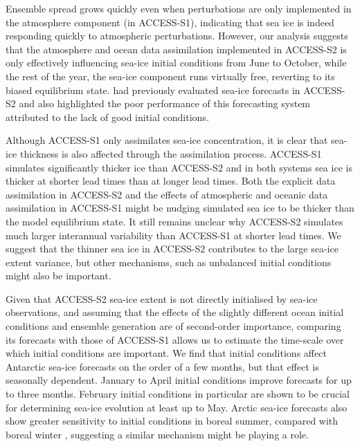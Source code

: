 \documentclass[tc, manuscript]{copernicus}
\begin{document}
Ensemble spread grows quickly even when perturbations are only
implemented in the atmosphere component (in ACCESS-S1), indicating that
sea ice is indeed responding quickly to atmospheric perturbations.
However, our analysis suggests that the atmosphere and ocean data
assimilation implemented in ACCESS-S2 is only effectively influencing
sea-ice initial conditions from June to October, while the rest of the
year, the sea-ice component runs virtually free, reverting to its biased
equilibrium state. \citet{zhou2022} had previously evaluated sea-ice
forecasts in ACCESS-S2 and also highlighted the poor performance of this
forecasting system attributed to the lack of good initial conditions.

Although ACCESS-S1 only assimilates sea-ice concentration, it is clear
that sea-ice thickness is also affected through the assimilation
process. ACCESS-S1 simulates significantly thicker ice than ACCESS-S2
and in both systems sea ice is thicker at shorter lead times than at
longer lead times. Both the explicit data assimilation in ACCESS-S2 and
the effects of atmospheric and oceanic data assimilation in ACCESS-S1
might be nudging simulated sea ice to be thicker than the model
equilibrium state. It still remains unclear why ACCESS-S2 simulates much
larger interannual variability than ACCESS-S1 at shorter lead times. We
suggest that the thinner sea ice in ACCESS-S2 contributes to the large
sea-ice extent variance, but other mechanisms, such as unbalanced
initial conditions might also be important.

Given that ACCESS-S2 sea-ice extent is not directly initialised by
sea-ice observations, and assuming that the effects of the slightly
different ocean initial conditions and ensemble generation are of
second-order importance, comparing its forecasts with those of ACCESS-S1
allows us to estimate the time-scale over which initial conditions are
important. We find that initial conditions affect Antarctic sea-ice
forecasts on the order of a few months, but that effect is seasonally
dependent. January to April initial conditions improve forecasts for up
to three months. February initial conditions in particular are shown to
be crucial for determining sea-ice evolution at least up to May. Arctic
sea-ice forecasts also show greater sensitivity to initial conditions in
boreal summer, compared with boreal winter \citep{day2014, bunzel2016},
suggesting a similar mechanism might be playing a role.
\end{document}

